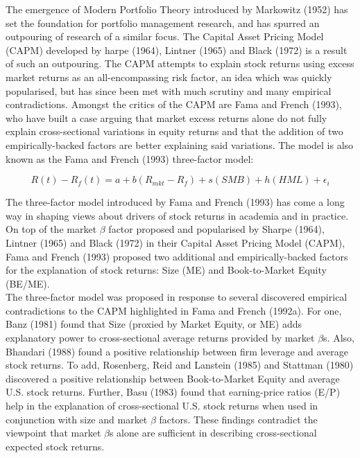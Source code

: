 \documentclass[12pt]{article}
\begin{document}
	The emergence of Modern Portfolio Theory introduced by Markowitz (1952) has set the foundation for portfolio management research, and has spurred an outpouring of research of a similar focus. The Capital Asset Pricing Model (CAPM) developed by harpe (1964), Lintner (1965) and Black (1972) is a result of such an outpouring. The CAPM attempts to explain stock returns using excess market returns as an all-encompassing risk factor, an idea which was quickly popularised, but has since been met with much scrutiny and many empirical contradictions. Amongst the critics of the CAPM are Fama and French (1993), who have built a case arguing that market excess returns alone do not fully explain cross-sectional variations in equity returns and that the addition of two empirically-backed factors are better explaining said variations. The model is also known as the Fama and French (1993) three-factor model:
	
	$$
	R(t) - R_f(t) = a+ b(R_{mkt} - R_f) + s(SMB) + h(HML) +\epsilon_i
	$$
	
	\noindent The three-factor model introduced by Fama and French (1993) has come a long way in shaping views about drivers of stock returns in academia and in practice. On top of the market $\beta$ factor proposed and popularised by Sharpe (1964), Lintner (1965) and Black (1972) in their Capital Asset Pricing Model (CAPM), Fama and French (1993) proposed two additional and empirically-backed factors for the explanation of stock returns: Size (ME) and Book-to-Market Equity (BE/ME). \\
	
	\noindent The three-factor model was proposed in response to several discovered empirical contradictions to the CAPM highlighted in Fama and French (1992a). For one, Banz (1981) found that Size (proxied by Market Equity, or ME) adds explanatory power to cross-sectional average returns provided by market $\beta$s. Also, Bhandari (1988) found a positive relationship between firm leverage and average stock returns. To add, Rosenberg, Reid and Lanstein (1985) and Stattman (1980) discovered a positive relationship between Book-to-Market Equity and average U.S. stock returns. Further, Basu (1983) found that earning-price ratios (E/P) help in the explanation of cross-sectional U.S. stock returns when used in conjunction with size and market $\beta$ factors. These findings contradict the viewpoint that market $\beta$s alone are sufficient in describing cross-sectional expected stock returns. \\
	
\end{document}
